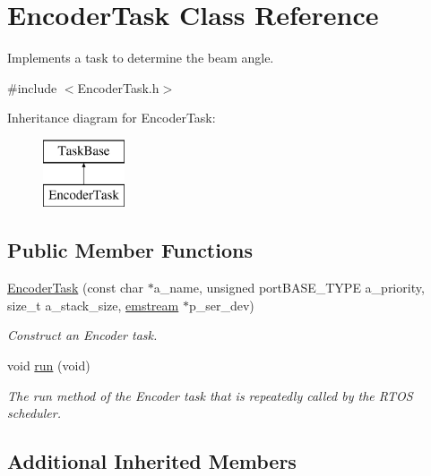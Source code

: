 \hypertarget{class_encoder_task}{}\section{Encoder\+Task Class Reference}
\label{class_encoder_task}


Implements a task to determine the beam angle.  




{\ttfamily \#include $<$Encoder\+Task.\+h$>$}

Inheritance diagram for Encoder\+Task\+:\begin{figure}[H]
\begin{center}
\leavevmode
\includegraphics[height=2.000000cm]{class_encoder_task}
\end{center}
\end{figure}
\subsection*{Public Member Functions}
\begin{DoxyCompactItemize}
\item 
\mbox{\hyperlink{class_encoder_task_af40f2d1f64b159deed631cf6fd7ad26f}{Encoder\+Task}} (const char $\ast$a\+\_\+name, unsigned port\+B\+A\+S\+E\+\_\+\+T\+Y\+PE a\+\_\+priority, size\+\_\+t a\+\_\+stack\+\_\+size, \mbox{\hyperlink{classemstream}{emstream}} $\ast$p\+\_\+ser\+\_\+dev)
\begin{DoxyCompactList}\small\item\em Construct an Encoder task. \end{DoxyCompactList}\item 
void \mbox{\hyperlink{class_encoder_task_a4dfd013fe548038f941ab130adeb90fd}{run}} (void)
\begin{DoxyCompactList}\small\item\em The run method of the Encoder task that is repeatedly called by the R\+T\+OS scheduler. \end{DoxyCompactList}\end{DoxyCompactItemize}
\subsection*{Additional Inherited Members}


